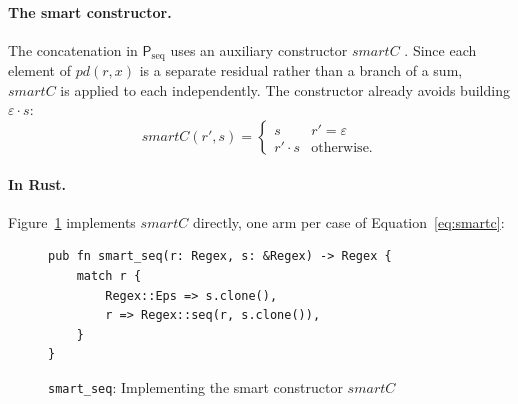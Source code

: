 %

\paragraph{The smart constructor.}
The concatenation in $\mathsf{P}_{\mathrm{seq}}$ 
uses an auxiliary constructor $\mathit{smartC}$ \citep[p.6]{sulzmann_slides}. 
Since each element of $pd(r,x)$ is a separate residual 
rather than a branch of a sum, 
$\mathit{smartC}$ is applied to each independently. 
The constructor already avoids building $\varepsilon \cdot s$:
\begin{equation}\label{eq:smartc}
\mathit{smartC}(r', s) =
  \begin{cases}
    s & r' = \varepsilon \\
    r' \cdot s & \text{otherwise.}
  \end{cases}
\end{equation}

%

\paragraph{In Rust.}
Figure~\ref{fig:smart-seq-rust} implements $\mathit{smartC}$ directly, 
one arm per case of Equation~\eqref{eq:smartc}:

\begin{figure}[H]
\small
\begin{verbatim}
pub fn smart_seq(r: Regex, s: &Regex) -> Regex {
    match r {
        Regex::Eps => s.clone(),
        r => Regex::seq(r, s.clone()),
    }
}
\end{verbatim}
\caption{\texttt{smart\_seq}: Implementing the smart constructor $\mathit{smartC}$}
\label{fig:smart-seq-rust}
\end{figure}

%

